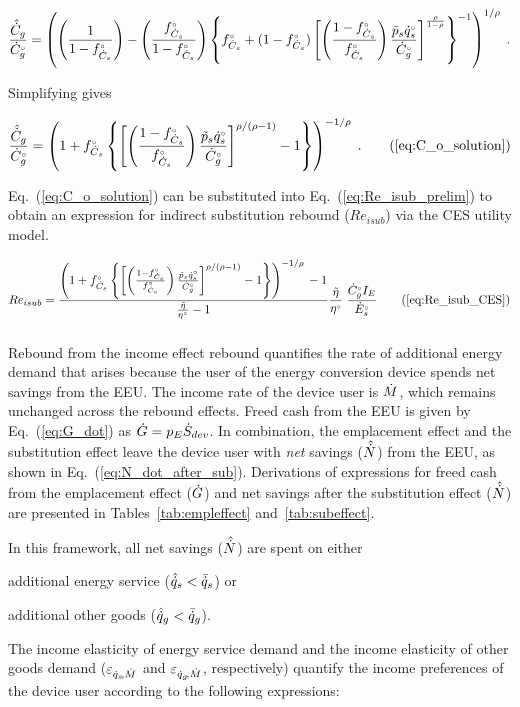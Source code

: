 \begin{equation}
  \frac{\hat{\dot{C}}_g}{{}{\dot{C}}^{\scriptscriptstyle \circ}_g} = \left( \left( \frac{1}{1-{}{f}^{\scriptscriptstyle \circ}_{\dot{C}_s}} \right) 
                                     - \left( \frac{{}{f}^{\scriptscriptstyle \circ}_{\dot{C}_s}}{1-{}{f}^{\scriptscriptstyle \circ}_{\dot{C}_s}} \right)   
              \left\{ {}{f}^{\scriptscriptstyle \circ}_{\dot{C}_s} + (1-{}{f}^{\scriptscriptstyle \circ}_{\dot{C}_s})
                  \left[ \left( \frac{1-{}{f}^{\scriptscriptstyle \circ}_{\dot{C}_s}}{{}{f}^{\scriptscriptstyle \circ}_{\dot{C}_s}} \right) \frac{\tilde{p}_s {}{\dot{q}}^{\scriptscriptstyle \circ}_s}{{}{\dot{C}}^{\scriptscriptstyle \circ}_g}   \right] 
                      ^{\frac{\rho}{1-\rho}} \right\} ^{-1} \right) ^{1/\rho} \; .
\end{equation}

Simplifying gives

\begin{equation}
  \frac{\rasub{C}_g}{\rbempl{C}_g} = \Cosolution{} \; . \tag{\ref{eq:C_o_solution}}
\end{equation}

Eq.~(\ref{eq:C_o_solution}) can be substituted into Eq.~(\ref{eq:Re_isub_prelim})
to obtain an expression for indirect substitution rebound ($Re_{isub}$)
via the CES utility model.

\begin{equation}
  Re_{isub} = \ReisubCES{} \tag{\ref{eq:Re_isub_CES}}
\end{equation}


\subsubsection{\Inceffect{}} 
\label{sec:Re_inc}

Rebound from the income effect rebound quantifies the rate of additional energy demand 
that arises because the user of the energy conversion device spends net
savings from the EEU.
The income rate of the device user is $\dot{M}$, 
which remains unchanged across the rebound effects.
Freed cash from the EEU is given by Eq.~(\ref{eq:G_dot})
as $\dot{G} = p_E \dot{S}_{dev}$. 
In combination, the emplacement effect and
the substitution effect leave the device user with
\emph{net} savings ($\hat{\dot{N}}$) from the EEU,
as shown in Eq.~(\ref{eq:N_dot_after_sub}).
Derivations of expressions for 
freed cash from the emplacement effect ($\dot{G}$) and
net savings after the substitution effect ($\hat{\dot{N}}$)
are presented in Tables~\ref{tab:empleffect} and~\ref{tab:subeffect}.

In this framework, all net savings ($\hat{\dot{N}}$) are spent on either 
%
\begin{enumerate*}[label={(\roman*)}]
	
  \item additional energy service 
        ($\hat{\dot{q}}_s < \bar{\dot{q}}_s$) or
  
  \item additional other goods
        ($\hat{\dot{q}}_g < \bar{\dot{q}}_g$).
    
\end{enumerate*}
%
The income elasticity of energy service demand and 
the income elasticity of other goods demand 
($\varepsilon_{\dot{q}_s\!,\dot{M}}$ and $\varepsilon_{\dot{q}_g\!,\dot{M}}$, respectively)
quantify the income preferences of the device user according to the following expressions:

